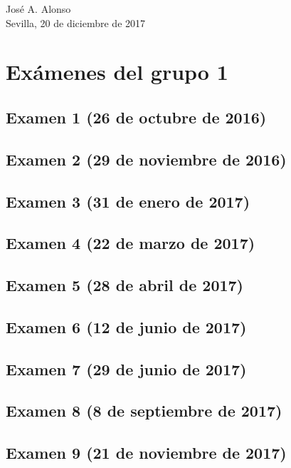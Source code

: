\documentclass[a4paper,12pt,twoside]{book}
\begin{document}
\begin{flushright}
  José A. Alonso \\
  Sevilla, 20 de diciembre de 2017
\end{flushright}

\chapter{Exámenes del grupo 1}
\section{Examen 1 (26 de octubre de 2016)}
\section{Examen 2 (29 de noviembre de 2016)}
\section{Examen 3 (31 de enero de 2017)}
 \label{examen_16_17_1_3}
\section{Examen 4 (22 de marzo de 2017)}
\section{Examen 5 (28 de abril de 2017)}
\section{Examen 6 (12 de junio de 2017)}
 \label{examen_16_17_1_6}
\section{Examen 7 (29 de junio de 2017)}
  \label{examen_16_17_1_7}
\section{Examen 8 (8 de septiembre de 2017)}
  \label{examen_16_17_1_8}
\section{Examen 9 (21 de noviembre de 2017)}
  \label{examen_16_17_1_9}
\end{document}
